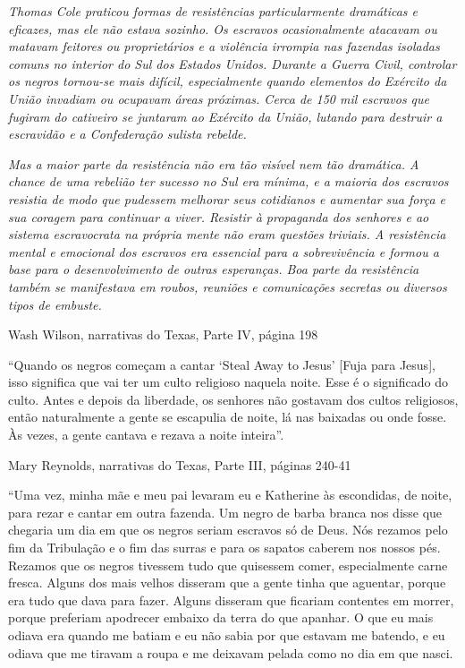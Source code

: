 \emph{Thomas Cole praticou formas de resistências particularmente
dramáticas e eficazes, mas ele não estava sozinho. Os escravos
ocasionalmente atacavam ou matavam feitores ou proprietários e a
violência irrompia nas fazendas isoladas comuns no interior do Sul dos
Estados Unidos. Durante a Guerra Civil, controlar os negros tornou-se
mais difícil, especialmente quando elementos do Exército da União
invadiam ou ocupavam áreas próximas. Cerca de 150 mil escravos que
fugiram do cativeiro se juntaram ao Exército da União, lutando para
destruir a escravidão e a Confederação sulista rebelde.}

\emph{Mas a maior parte da resistência não era tão visível nem tão
dramática. A chance de uma rebelião ter sucesso no Sul era mínima, e a
maioria dos escravos resistia de modo que pudessem melhorar seus
cotidianos e aumentar sua força e sua coragem para continuar a viver.
Resistir à propaganda dos senhores e ao sistema escravocrata na própria
mente não eram questões triviais. A resistência mental e emocional dos
escravos era essencial para a sobrevivência e formou a base para o
desenvolvimento de outras esperanças. Boa parte da resistência também se
manifestava em roubos, reuniões e comunicações secretas ou diversos
tipos de embuste.}

Wash Wilson, narrativas do Texas, Parte IV, página 198

``Quando os negros começam a cantar `Steal Away to Jesus' {[}Fuja para
Jesus{]}, isso significa que vai ter um culto religioso naquela noite.
Esse é o significado do culto. Antes e depois da liberdade, os senhores
não gostavam dos cultos religiosos, então naturalmente a gente se
escapulia de noite, lá nas baixadas ou onde fosse. Às vezes, a gente
cantava e rezava a noite inteira''.

Mary Reynolds, narrativas do Texas, Parte III, páginas 240-41

``Uma vez, minha mãe e meu pai levaram eu e Katherine às escondidas, de
noite, para rezar e cantar em outra fazenda. Um negro de barba branca
nos disse que chegaria um dia em que os negros seriam escravos só de
Deus. Nós rezamos pelo fim da Tribulação e o fim das surras e para os
sapatos caberem nos nossos pés. Rezamos que os negros tivessem tudo que
quisessem comer, especialmente carne fresca. Alguns dos mais velhos
disseram que a gente tinha que aguentar, porque era tudo que dava para
fazer. Alguns disseram que ficariam contentes em morrer, porque
preferiam apodrecer embaixo da terra do que apanhar. O que eu mais
odiava era quando me batiam e eu não sabia por que estavam me batendo, e
eu odiava que me tiravam a roupa e me deixavam pelada como no dia em que
nasci.

